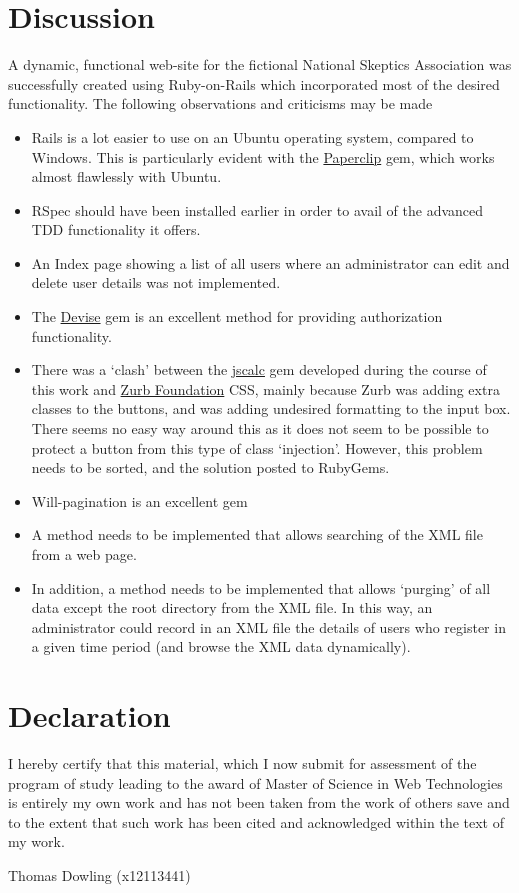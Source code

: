\documentclass[11pt]{article}
\begin{document}
 \section{Discussion} 
 A dynamic, functional web-site for the fictional National Skeptics Association was successfully created using Ruby-on-Rails which incorporated most of the desired functionality. 
 The following observations and criticisms may be made
 \begin{itemize}
 \item[] Rails is a lot easier to use on an Ubuntu operating system, compared to Windows.  This is particularly evident
 with the \href{http://rubygems.org/gems/paperclip}{Paperclip}  gem, which works almost flawlessly with Ubuntu. 
 \item[] RSpec should have been installed earlier in order to avail of the advanced TDD functionality it offers.
 \item [] An Index page showing a list of all users where an administrator can edit and delete user details was not implemented. 
 \item[] The \href{https://github.com/plataformatec/devise}{Devise} gem is an excellent method for providing authorization functionality. 
 \item[] There was a `clash' between the \href{https://rubygems.org/gems/jscalc}{jscalc} gem developed during the course of this work and \href{http://zurb.com/}{Zurb Foundation} CSS, mainly because Zurb was adding extra classes
 to the buttons, and was adding undesired formatting to the input box. There seems no easy way around this as it 
does not seem to be possible to protect a button from this type of class `injection'. However, this problem  needs to be sorted, and
the solution posted to RubyGems. 
\item[] Will-pagination is an excellent gem
\item[] A method needs to be implemented that allows searching of the XML file from a web page. 
\item[] In addition, a method needs to 
be implemented that allows `purging' of all data except the root directory from the XML file.  In this way, an administrator could
record in an XML file the details of users who register in a given time period (and browse the XML data dynamically). 
 \end{itemize}
\hypertarget{label:sectmeDEC}{ \section{Declaration}\label{label:medec}}

I hereby certify that this material, which I now submit for assessment of the program of study leading to the award of Master of Science in Web Technologies is entirely my own work and has not been taken from the work of others save and to the extent that such work has been cited and acknowledged within the text of my work.

\vspace*{15px}
\noindent
Thomas Dowling (x12113441)


\hypersetup{linkcolor=blue}

\hphantom{M}
\hphantom{M}
\end{document}
